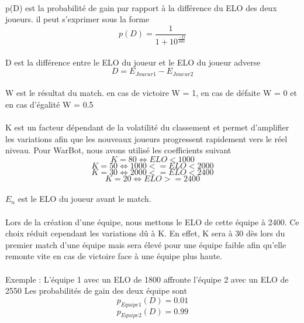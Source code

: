 \documentclass{report}
\begin{document}
\paragraph{}
p(D) est la probabilité de gain par rapport à la différence du ELO des deux joueurs. il peut s'exprimer sous la forme
\[ 
p(D) = \frac{1}{1 + 10^{\frac{-D}{400}}}
\]
\paragraph{}
D est la différence entre le ELO du joueur et le ELO du joueur adverse
\[
D = E_{Joueur 1} - E_{Joueur 2}
\]
\paragraph{}
W est le résultat du match. en cas de victoire W = 1, en cas de défaite W = 0 et en cas d'égalité W = 0.5
\paragraph{}
K est un facteur dépendant de la volatilité du classement et permet d'amplifier les variations afin que les nouveaux joueurs progressent rapidement vers le réel niveau. Pour WarBot, nous avons utilisé les coefficients suivant
\[
K = 80 \iff ELO < 1000 
\]
\[
K = 50 \iff 1000 <= ELO < 2000
\]
\[
K = 30 \iff 2000 <= ELO < 2400
\]
\[
K = 20 \iff ELO >= 2400
\]
\paragraph{}
$E_n$ est le ELO du joueur avant le match.
\paragraph{}
Lors de la création d'une équipe, nous mettons le ELO de cette équipe à 2400. Ce choix réduit cependant les variations dû à K. En effet, K sera à 30 dès lors du premier match d'une équipe mais sera élevé pour une équipe faible afin qu'elle remonte vite en cas de victoire face à une équipe plus haute.
\paragraph{}
\newpage
Exemple : \newline
L'équipe 1 avec un ELO de 1800 affronte l'équipe 2 avec un ELO de 2550 \newline
Les probabilités de gain des deux équipe sont
\[
p_{Equipe 1}(D) = 0.01
\]
\[
p_{Equipe 2}(D) = 0.99
\]\newline
\end{document}

